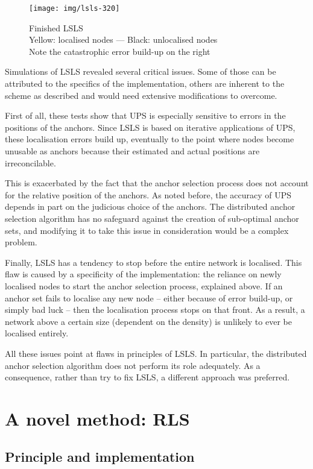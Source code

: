 \documentclass[12pt,a4paper,fleqn]{report}
\begin{document}
\begin{figure}[h]
	\centering
	\texttt{[image: img/lsls-320]}
	\caption{%
	Finished LSLS \\
	Yellow: localised nodes —
	Black: unlocalised nodes \\
	Note the catastrophic error build-up on the right
	}
\end{figure}

Simulations of LSLS revealed several critical issues. Some of those can be attributed to the specifics of the implementation, others are inherent to the scheme as described and would need extensive modifications to overcome.

First of all, these tests show that UPS is especially sensitive to errors in the positions of the anchors. Since LSLS is based on iterative applications of UPS, these localisation errors build up, eventually to the point where nodes become unusable as anchors because their estimated and actual positions are irreconcilable.

This is exacerbated by the fact that the anchor selection process does not account for the relative position of the anchors. As noted before, the accuracy of UPS depends in part on the judicious choice of the anchors. The distributed anchor selection algorithm has no safeguard against the creation of sub-optimal anchor sets, and modifying it to take this issue in consideration would be a complex problem.

Finally, LSLS has a tendency to stop before the entire network is localised. This flaw is caused by a specificity of the implementation: the reliance on newly localised nodes to start the anchor selection process, explained above. If an anchor set fails to localise any new node – either because of error build-up, or simply bad luck – then the localisation process stops on that front. As a result, a network above a certain size (dependent on the density) is unlikely to ever be localised entirely.

All these issues point at flaws in principles of LSLS. In particular, the distributed anchor selection algorithm does not perform its role adequately. As a consequence, rather than try to fix LSLS, a different approach was preferred.


\section{A novel method: RLS}

\subsection{Principle and implementation}
\end{document}
